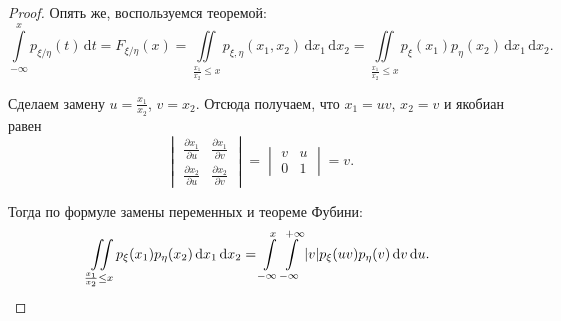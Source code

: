 \begin{proof}
	Опять же, воспользуемся теоремой:
	\[\int\limits_{-\infty}^{x} p_{\xi/\eta}(t)\,\mathrm{d}t = F_{\xi/\eta}(x) =  \iint\limits_{\frac{x_{1}}{x_{2}} \leq x} p_{\xi, \eta}(x_1, x_2)\,\mathrm{d}x_1\,\mathrm{d}x_2 = \iint\limits_{\frac{x_{1}}{x_{2}} \leq x} p_{\xi}(x_1)p_{\eta}(x_2)\,\mathrm{d}x_1\,\mathrm{d}x_2.\]
	
	Сделаем замену \(u = \frac{x_1}{x_2}\), \(v = x_2\). Отсюда получаем, что \(x_1 = uv\), \(x_2 = v\) и якобиан равен
	\[
	\begin{vmatrix}
	\frac{\partial x_1}{\partial u} & \frac{\partial x_1}{\partial v} \\[0.3em]
	\frac{\partial x_2}{\partial u} & \frac{\partial x_2}{\partial v}
	\end{vmatrix}
	=
	\begin{vmatrix}
	v & u \\
	0 & 1
	\end{vmatrix}
	= v.
	\]
	
	Тогда по формуле замены переменных и теореме Фубини:
	\[\iint\limits_{\frac{x_{1}}{x_{2}} \leq x} p_{\xi}(x_1)p_{\eta}(x_2)\,\mathrm{d}x_1\,\mathrm{d}x_2 = \int\limits_{-\infty}^{x} \int\limits_{-\infty}^{+\infty} |v| p_{\xi}(uv)p_{\eta}(v)\,\mathrm{d}v\,\mathrm{d}u.\qedhere\]
\end{proof}